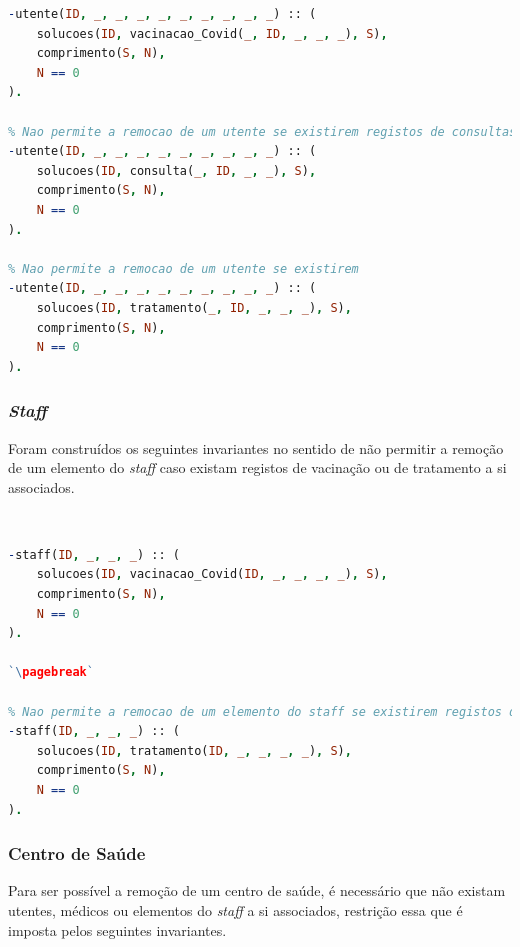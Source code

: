 \documentclass[a4paper, 11pt]{article}
\begin{document}
\begin{lstlisting}[language=Prolog, caption={Invariantes de remoção relativos ao predicado \texttt{utente}}]
% Nao permite a remocao de um utente se existirem registos de vacinacao a si associados
-utente(ID, _, _, _, _, _, _, _, _, _) :: (
    solucoes(ID, vacinacao_Covid(_, ID, _, _, _), S),
    comprimento(S, N),
    N == 0
).

% Nao permite a remocao de um utente se existirem registos de consultas a si associaos
-utente(ID, _, _, _, _, _, _, _, _, _) :: (
    solucoes(ID, consulta(_, ID, _, _), S),
    comprimento(S, N),
    N == 0
).

% Nao permite a remocao de um utente se existirem
-utente(ID, _, _, _, _, _, _, _, _, _) :: (
    solucoes(ID, tratamento(_, ID, _, _, _), S),
    comprimento(S, N),
    N == 0
).
\end{lstlisting}

\subsubsection*{\textit{Staff}}

Foram construídos os seguintes invariantes no sentido de não permitir a remoção de um elemento do \textit{staff}
caso existam registos de vacinação ou de tratamento a si associados.

\

\begin{lstlisting}[language=Prolog, caption={Invariantes de remoção relativos ao predicado \texttt{staff}}]
% Nao permite a remocao de um elemento do staff se existirem registos de vacinacao a si associaos
-staff(ID, _, _, _) :: (
    solucoes(ID, vacinacao_Covid(ID, _, _, _, _), S),
    comprimento(S, N),
    N == 0
).

`\pagebreak`

% Nao permite a remocao de um elemento do staff se existirem registos de tratamentos a si associaos
-staff(ID, _, _, _) :: (
    solucoes(ID, tratamento(ID, _, _, _, _), S),
    comprimento(S, N),
    N == 0
).
\end{lstlisting}


\subsubsection*{Centro de Saúde}

Para ser possível a remoção de um centro de saúde, é necessário que não existam utentes, médicos ou elementos do \textit{staff}
a si associados, restrição essa que é imposta pelos seguintes invariantes.
\end{document}
